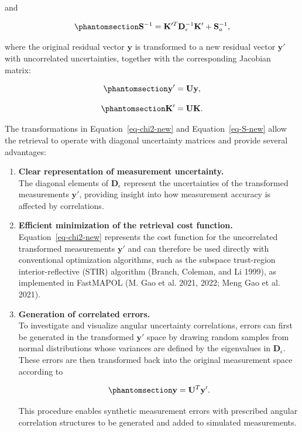 \documentclass[
  11pt,
  letterpaper,
  DIV=11,
  numbers=noendperiod]{scrreprt}
\begin{document}
and

\begin{equation}\phantomsection\label{eq-S-new}{
\mathbf{S}^{-1}
=
\mathbf{K}'^{T}
\mathbf{D}_{\epsilon}^{-1}
\mathbf{K}'
+
\mathbf{S}_{a}^{-1},
}\end{equation}

where the original residual vector \(\mathbf{y}\) is transformed to a
new residual vector \(\mathbf{y}'\) with uncorrelated uncertainties,
together with the corresponding Jacobian matrix:

\begin{equation}\phantomsection\label{eq-y-transform}{
\mathbf{y}'
=
\mathbf{U}\mathbf{y},
}\end{equation}

\begin{equation}\phantomsection\label{eq-K-transform}{
\mathbf{K}'
=
\mathbf{U}\mathbf{K}.
}\end{equation}

The transformations in Equation~\ref{eq-chi2-new} and
Equation~\ref{eq-S-new} allow the retrieval to operate with diagonal
uncertainty matrices and provide several advantages:

\begin{enumerate}
\def\labelenumi{\arabic{enumi}.}
\item
  \textbf{Clear representation of measurement uncertainty.}\\
  The diagonal elements of \(\mathbf{D}_{\epsilon}\) represent the
  uncertainties of the transformed measurements \(\mathbf{y}'\),
  providing insight into how measurement accuracy is affected by
  correlations.
\item
  \textbf{Efficient minimization of the retrieval cost function.}\\
  Equation~\ref{eq-chi2-new} represents the cost function for the
  uncorrelated transformed measurements \(\mathbf{y}'\) and can
  therefore be used directly with conventional optimization algorithms,
  such as the subspace trust-region interior-reflective (STIR) algorithm
  (Branch, Coleman, and Li 1999), as implemented in FastMAPOL (M. Gao et
  al. 2021, 2022; Meng Gao et al. 2021).
\item
  \textbf{Generation of correlated errors.}\\
  To investigate and visualize angular uncertainty correlations, errors
  can first be generated in the transformed \(\mathbf{y}'\) space by
  drawing random samples from normal distributions whose variances are
  defined by the eigenvalues in \(\mathbf{D}_{\epsilon}\). These errors
  are then transformed back into the original measurement space
  according to

  \begin{equation}\phantomsection\label{eq-y-inverse-transform}{
  \mathbf{y}
  =
  \mathbf{U}^{T}\mathbf{y}'.
  }\end{equation}

  This procedure enables synthetic measurement errors with prescribed
  angular correlation structures to be generated and added to simulated
  measurements.
\end{enumerate}
\end{document}
